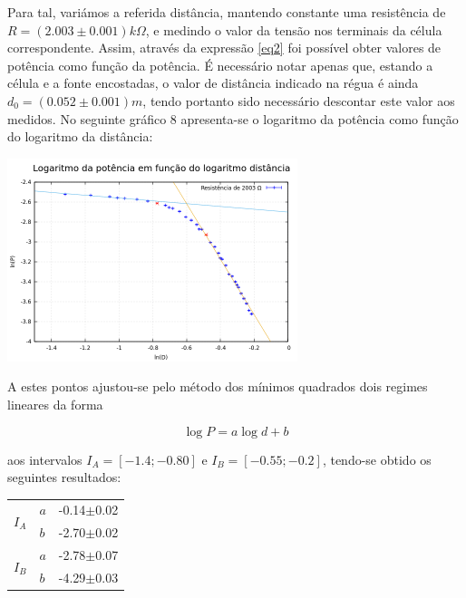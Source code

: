 \documentclass[10pt]{extarticle}
\begin{document}
\begin{multicols}{2}
\par Para tal, variámos a referida distância, mantendo constante uma resistência de $R=(2.003\pm0.001)k\Omega$, e medindo o valor da tensão nos terminais da célula correspondente. Assim, através da expressão \eqref{eq2} foi possível obter valores de potência como função da potência. É necessário notar apenas que, estando a célula e a fonte encostadas, o valor de distância indicado na régua é ainda $d_0=(0.052\pm0.001)m$, tendo portanto sido necessário descontar este valor aos medidos. No seguinte gráfico 8 apresenta-se o logaritmo da potência como função do logaritmo da distância:

\begin{center}
\includegraphics[width=240pt]{lnP-lnD}
\par{}
\end{center}

\par A estes pontos ajustou-se pelo método dos mínimos quadrados dois regimes lineares da forma

\begin{equation}
\log{P} = a\log{d}+b
\end{equation}

\par\noindent aos intervalos $I_A=[-1.4;-0.80]$ e $I_B=[-0.55;-0.2]$, tendo-se obtido os seguintes resultados:

\begin{center}
\begin{tabular}{ x{0.7cm} x{0.7cm} x{2cm}}
\hline \hline
{} & $a$ & -0.14$\pm$0.02 \tabularnewline
 & $b$ & -2.70$\pm$0.02 \tabularnewline
{} & $a$ & -2.78$\pm$0.07 \tabularnewline
 & $b$ & -4.29$\pm$0.03 \tabularnewline
\hline \hline
\end{tabular}
\end{center}


\end{multicols}
\end{document}
